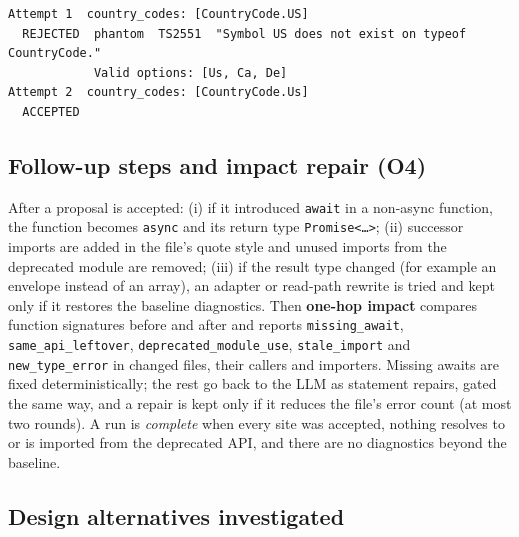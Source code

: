 \documentclass[11pt,a4paper]{article}
\newcommand{\code}[1]{\texttt{#1}}
\begin{document}
\begin{lstlisting}[caption={Gate feedback on the Plaid call (saved run, gpt-4o-mini).}, label={lst:gate}, numbers=none]
Attempt 1  country_codes: [CountryCode.US]
  REJECTED  phantom  TS2551  "Symbol US does not exist on typeof CountryCode."
            Valid options: [Us, Ca, De]
Attempt 2  country_codes: [CountryCode.Us]
  ACCEPTED
\end{lstlisting}

\subsection{Follow-up steps and impact repair (O4)}

After a proposal is accepted: (i) if it introduced \code{await} in a non-async function,
the function becomes \code{async} and its return type \code{Promise<\dots>}; (ii) successor
imports are added in the file's quote style and unused imports from the deprecated module are
removed; (iii) if the result type changed (for example an envelope instead of an array),
an adapter or read-path rewrite is tried and kept only if it restores the baseline diagnostics.
Then \textbf{one-hop impact} compares function signatures before and after and reports
\code{missing\_await}, \code{same\_api\_leftover}, \code{deprecated\_module\_use},
\code{stale\_import} and \code{new\_type\_error} in changed files, their callers and importers.
Missing awaits are fixed deterministically; the rest go back to the LLM as statement repairs,
gated the same way, and a repair is kept only if it reduces the file's error count (at most two
rounds). A run is \emph{complete} when every site was accepted, nothing resolves to or is
imported from the deprecated API, and there are no diagnostics beyond the baseline.

\subsection{Design alternatives investigated}
\label{sec:alternatives}
\end{document}
